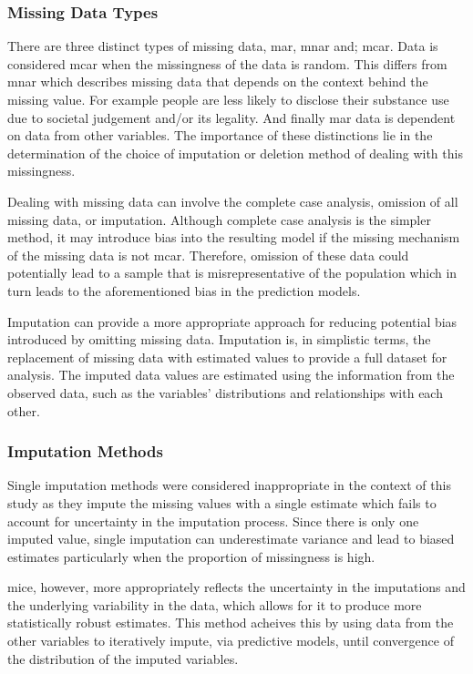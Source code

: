 \documentclass[11pt]{article}
\begin{document}
\subsubsection{Missing Data Types}
There are three distinct types of missing data, \gls{mar}, \gls{mnar} and; \gls{mcar}. Data is considered \gls{mcar} when the missingness of the data is random\cite{Mack2018}. This differs from \gls{mnar} which describes missing data that depends on the context behind the missing value. For example people are less likely to disclose their substance use due to societal judgement and/or its legality. And finally \gls{mar} data is dependent on data from other variables\cite{Yan2025}. The importance of these distinctions lie in the determination of the choice of imputation or deletion method of dealing with this missingness.

Dealing with missing data can involve the complete case analysis, omission of all missing data\cite{Ross2020}, or imputation. Although complete case analysis is the simpler method, it may introduce bias into the resulting model if the missing mechanism of the missing data is not \gls{mcar}\cite{Kang2013}. Therefore, omission of these data could potentially lead to a sample that is misrepresentative of the population which in turn leads to the aforementioned bias in the prediction models\cite{Peng2023}.

Imputation can provide a more appropriate approach for reducing potential bias introduced by omitting missing data. Imputation is, in simplistic terms, the replacement of missing data with estimated values to provide a full dataset for analysis. The imputed data values are estimated using the information from the observed data, such as the variables' distributions and relationships with each other\cite{Sterne2009}.

\subsubsection{Imputation Methods}

Single imputation methods were considered inappropriate in the context of this study as they impute the missing values with a single estimate which fails to account for uncertainty in the imputation process\cite{Dettori2018}. Since there is only one imputed value, single imputation can underestimate variance and lead to biased estimates particularly when the proportion of missingness is high\cite{Buuren2019}.

\gls{mice}, however, more appropriately reflects the uncertainty in the imputations and the underlying variability in the data, which allows for it to produce more statistically robust estimates. This method acheives this by using data from the other variables to iteratively impute, via predictive models, until convergence of the distribution of the imputed variables\cite{White2010}.
\end{document}
